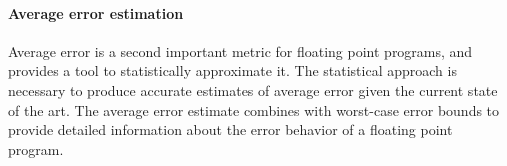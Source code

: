 \documentclass[main.tex]{subfiles}
\begin{document}
\paragraph{Average error estimation}
Average error is a second important metric for floating point programs,
  and \name provides a tool to statistically approximate it.
The statistical approach is necessary to produce accurate estimates
  of average error given the current state of the art.
The average error estimate combines with worst-case error bounds
  to provide detailed information about the error behavior
  of a floating point program.
\end{document}
